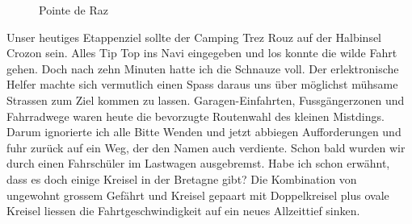\begin{figure}[H]
   \centering
   \quad
   \quad
   \quad
   \caption[Pointe de Raz]{Pointe de Raz}
\end{figure}

Unser heutiges Etappenziel sollte der Camping Trez Rouz auf der Halbinsel Crozon sein.
Alles Tip Top ins Navi eingegeben und los konnte die wilde Fahrt gehen.
Doch nach zehn Minuten hatte ich die Schnauze voll.
Der erlektronische Helfer machte sich vermutlich einen Spass daraus uns über möglichst mühsame Strassen zum Ziel kommen zu lassen.
Garagen-Einfahrten, Fussgängerzonen und Fahrradwege waren heute die bevorzugte Routenwahl des kleinen Mistdings.
Darum ignorierte ich alle Bitte Wenden und jetzt abbiegen Aufforderungen und fuhr zurück auf ein Weg, der den Namen auch verdiente.
Schon bald wurden wir durch einen Fahrschüler im Lastwagen ausgebremst.
Habe ich schon erwähnt, dass es doch einige Kreisel in der Bretagne gibt?
Die Kombination von ungewohnt grossem Gefährt und Kreisel gepaart mit Doppelkreisel plus ovale Kreisel liessen die Fahrtgeschwindigkeit auf ein neues Allzeittief sinken.

